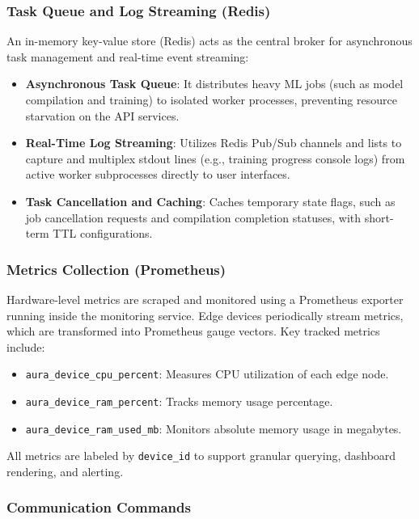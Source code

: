 \subsubsection{Task Queue and Log Streaming (Redis)}\label{sec:redis_storage}

An in-memory key-value store (Redis) acts as the central broker for asynchronous task management and real-time event streaming:
\begin{itemize}
    \item \textbf{Asynchronous Task Queue}: It distributes heavy \gls{ML} jobs (such as model compilation and training) to isolated worker processes, preventing resource starvation on the \gls{API} services.
    \item \textbf{Real-Time Log Streaming}: Utilizes Redis Pub/Sub channels and lists to capture and multiplex stdout lines (e.g., training progress console logs) from active worker subprocesses directly to user interfaces.
    \item \textbf{Task Cancellation and Caching}: Caches temporary state flags, such as job cancellation requests and compilation completion statuses, with short-term \gls{TTL} configurations.
\end{itemize}

\subsubsection{Metrics Collection (Prometheus)}\label{sec:prometheus_storage}

Hardware-level metrics are scraped and monitored using a Prometheus exporter running inside the monitoring service. Edge devices periodically stream metrics, which are transformed into Prometheus gauge vectors. Key tracked metrics include:
\begin{itemize}
    \item \texttt{aura\_device\_cpu\_percent}: Measures \gls{CPU} utilization of each edge node.
    \item \texttt{aura\_device\_ram\_percent}: Tracks memory usage percentage.
    \item \texttt{aura\_device\_ram\_used\_mb}: Monitors absolute memory usage in megabytes.
\end{itemize}
All metrics are labeled by \texttt{device\_id} to support granular querying, dashboard rendering, and alerting.

\subsubsection{Communication Commands}\label{sec:commands}

